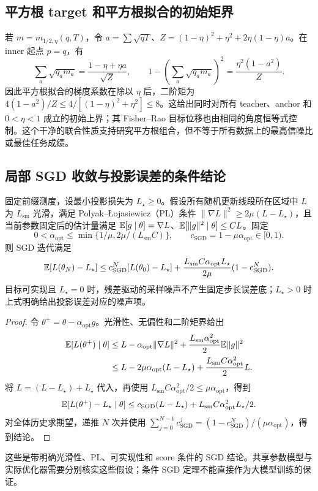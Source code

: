 \subsection{平方根 target 和平方根拟合的初始矩界}

若 $m=m_{1/2,\eta}(q,T)$，令 $a=\sum\sqrt{qT}$、$Z=(1-\eta)^2+\eta^2+2\eta(1-\eta)a$。在 inner 起点 $p=q$，有
\begin{equation}
 \sum_a\sqrt{q_am_a}=\frac{1-\eta+\eta a}{\sqrt Z},\qquad
 1-\left(\sum_a\sqrt{q_am_a}\right)^2=\frac{\eta^2(1-a^2)}Z.
\end{equation}
因此平方根拟合的梯度系数在除以 $\eta$ 后，二阶矩为 $4(1-a^2)/Z\le4/[(1-\eta)^2+\eta^2]\le8$。这给出同时对所有 teacher、anchor 和 $0<\eta<1$ 成立的初始上界；其 Fisher--Rao 目标位移也由相同的角度恒等式控制。这个干净的联合性质支持研究平方根组合，但不等于所有数据上的最高信噪比或最佳任务成绩。

\subsection{局部 SGD 收敛与投影误差的条件结论}

\begin{theorem}
\label{thm:power-conditional-sgd}
固定前缀测度，设最小投影损失为 $L_\star\ge0$。假设所有随机更新线段所在区域中 $L$ 为 $L_{\mathrm{sm}}$ 光滑，满足 Polyak--\L{}ojasiewicz（PL）条件 $\|\nabla L\|^2\ge2\mu(L-L_\star)$，且当前参数固定后的估计量满足 $\mathbb E[g\mid\theta]=\nabla L$、$\mathbb E[\|g\|^2\mid\theta]\le CL$。固定
\begin{equation}
 0<\alpha_{\mathrm{opt}}\le\min\{1/\mu,2\mu/(L_{\mathrm{sm}}C)\},\qquad
 c_{\mathrm{SGD}}=1-\mu\alpha_{\mathrm{opt}}\in[0,1).
\end{equation}
则 SGD 迭代满足
\begin{equation}
 \mathbb E[L(\theta_N)-L_\star]
 \le c_{\mathrm{SGD}}^N[L(\theta_0)-L_\star]
 +\frac{L_{\mathrm{sm}}C\alpha_{\mathrm{opt}}L_\star}{2\mu}(1-c_{\mathrm{SGD}}^N).
\end{equation}
目标可实现且 $L_\star=0$ 时，残差驱动的采样噪声不产生固定步长误差底；$L_\star>0$ 时上式明确给出投影误差对应的噪声项。
\end{theorem}

\begin{proof}
令 $\theta^+=\theta-\alpha_{\mathrm{opt}}g$。光滑性、无偏性和二阶矩界给出
\begin{align}
 \mathbb E[L(\theta^+)\mid\theta]
 &\le L-\alpha_{\mathrm{opt}}\|\nabla L\|^2+
 \frac{L_{\mathrm{sm}}\alpha_{\mathrm{opt}}^2}2\mathbb E\|g\|^2\\
 &\le L-2\mu\alpha_{\mathrm{opt}}(L-L_\star)
 +\frac{L_{\mathrm{sm}}C\alpha_{\mathrm{opt}}^2}{2}L.
\end{align}
将 $L=(L-L_\star)+L_\star$ 代入，再使用 $L_{\mathrm{sm}}C\alpha_{\mathrm{opt}}^2/2\le\mu\alpha_{\mathrm{opt}}$，得到
\begin{equation}
 \mathbb E[L(\theta^+)-L_\star\mid\theta]
 \le c_{\mathrm{SGD}}(L-L_\star)+L_{\mathrm{sm}}C\alpha_{\mathrm{opt}}^2L_\star/2.
\end{equation}
对全体历史求期望，递推 $N$ 次并使用 $\sum_{j=0}^{N-1}c_{\mathrm{SGD}}^j=(1-c_{\mathrm{SGD}}^N)/(\mu\alpha_{\mathrm{opt}})$，得到结论。
\end{proof}

这些是带明确光滑性、PL、可实现性和 score 条件的 SGD 结论。共享参数模型与实际优化器需要分别核实这些假设；条件 SGD 定理不能直接作为大模型训练的保证。
